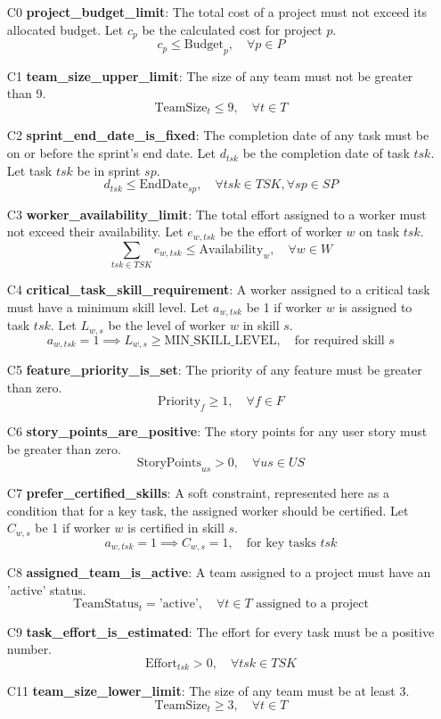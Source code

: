\documentclass[11pt]{article}
\begin{document}
\begin{itemize}
    \item[C0] \textbf{project\_budget\_limit}: The total cost of a project must not exceed its allocated budget. Let $c_p$ be the calculated cost for project $p$.
    $$ c_p \leq \text{Budget}_p, \quad \forall p \in P $$
    \item[C1] \textbf{team\_size\_upper\_limit}: The size of any team must not be greater than 9.
    $$ \text{TeamSize}_t \leq 9, \quad \forall t \in T $$
    \item[C2] \textbf{sprint\_end\_date\_is\_fixed}: The completion date of any task must be on or before the sprint's end date. Let $d_{tsk}$ be the completion date of task $tsk$. Let task $tsk$ be in sprint $sp$.
    $$ d_{tsk} \leq \text{EndDate}_{sp}, \quad \forall tsk \in TSK, \forall sp \in SP $$
    \item[C3] \textbf{worker\_availability\_limit}: The total effort assigned to a worker must not exceed their availability. Let $e_{w,tsk}$ be the effort of worker $w$ on task $tsk$.
    $$ \sum_{tsk \in TSK} e_{w,tsk} \leq \text{Availability}_w, \quad \forall w \in W $$
    \item[C4] \textbf{critical\_task\_skill\_requirement}: A worker assigned to a critical task must have a minimum skill level. Let $a_{w,tsk}$ be 1 if worker $w$ is assigned to task $tsk$. Let $L_{w,s}$ be the level of worker $w$ in skill $s$.
    $$ a_{w,tsk} = 1 \implies L_{w,s} \geq \text{MIN\_SKILL\_LEVEL}, \quad \text{for required skill } s $$
    \item[C5] \textbf{feature\_priority\_is\_set}: The priority of any feature must be greater than zero.
    $$ \text{Priority}_f \geq 1, \quad \forall f \in F $$
    \item[C6] \textbf{story\_points\_are\_positive}: The story points for any user story must be greater than zero.
    $$ \text{StoryPoints}_{us} > 0, \quad \forall us \in US $$
    \item[C7] \textbf{prefer\_certified\_skills}: A soft constraint, represented here as a condition that for a key task, the assigned worker should be certified. Let $C_{w,s}$ be 1 if worker $w$ is certified in skill $s$.
    $$ a_{w,tsk} = 1 \implies C_{w,s} = 1, \quad \text{for key tasks } tsk $$
    \item[C8] \textbf{assigned\_team\_is\_active}: A team assigned to a project must have an 'active' status.
    $$ \text{TeamStatus}_t = \text{'active'}, \quad \forall t \in T \text{ assigned to a project} $$
    \item[C9] \textbf{task\_effort\_is\_estimated}: The effort for every task must be a positive number.
    $$ \text{Effort}_{tsk} > 0, \quad \forall tsk \in TSK $$
    \item[C11] \textbf{team\_size\_lower\_limit}: The size of any team must be at least 3.
    $$ \text{TeamSize}_t \geq 3, \quad \forall t \in T $$
\end{itemize}
\end{document}
